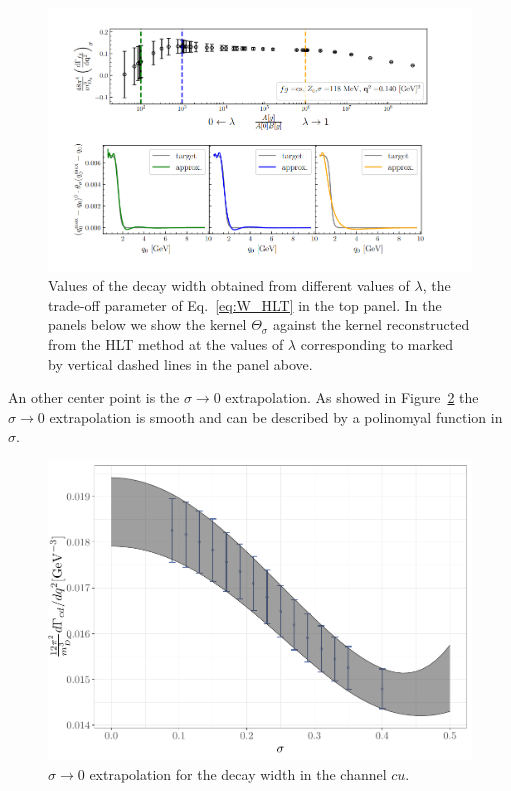 \documentclass [a4paper, 11pt]{article}
\begin{document}
\begin{figure}
	\includegraphics[scale=0.5]{figures/Screenshot from 2024-07-27 18-12-04.png}
	\caption{Values of the decay width obtained from different values of $\lambda$, the trade-off
		parameter of Eq.~\ref{eq:W_HLT} in the top panel. In the panels below we show the kernel $\Theta_\sigma$ against the kernel reconstructed from the HLT method at the values of  $\lambda$ corresponding to
		marked by vertical dashed lines in the panel above.
	}
	\label{fig:stability}
\end{figure}

An other center  point is the $\sigma \to 0$ extrapolation. As showed in Figure~\ref{fig:sigma_extrapolation} the $\sigma \to 0$ extrapolation is smooth and can be described by
a polinomyal function in $\sigma$.
\begin{figure}
	\centering
	\includegraphics[scale=0.5]{figures/sigma_extrapolation.pdf}
	\caption{ $\sigma \to 0 $ extrapolation for the decay width in the channel $cu$.
	}
	\label{fig:sigma_extrapolation}
\end{figure}
\end{document}
